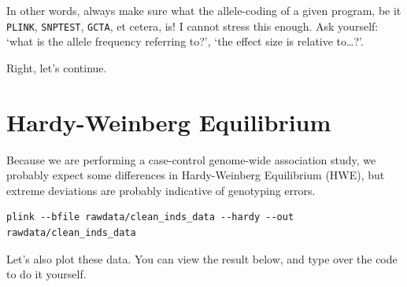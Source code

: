 \documentclass[
]{book}
\newenvironment{Shaded}{\begin{snugshade}}{\end{snugshade}}
\newcommand{\FunctionTok}[1]{\textcolor[rgb]{0.00,0.00,0.00}{#1}}
\newcommand{\NormalTok}[1]{#1}
\newcommand{\OtherTok}[1]{\textcolor[rgb]{0.56,0.35,0.01}{#1}}
\newcommand{\SpecialCharTok}[1]{\textcolor[rgb]{0.00,0.00,0.00}{#1}}
\newcommand{\StringTok}[1]{\textcolor[rgb]{0.31,0.60,0.02}{#1}}
\begin{document}
In other words, always make sure what the allele-coding of a given program, be it \texttt{PLINK}, \texttt{SNPTEST}, \texttt{GCTA}, et cetera, is! I cannot stress this enough. Ask yourself: `what is the allele frequency referring to?', `the effect size is relative to\ldots?'.

Right, let's continue.

\hypertarget{hardy-weinberg-equilibrium}{%
\section{Hardy-Weinberg Equilibrium}\label{hardy-weinberg-equilibrium}}

Because we are performing a case-control genome-wide association study, we probably expect some differences in Hardy-Weinberg Equilibrium (HWE), but extreme deviations are probably indicative of genotyping errors.

\begin{verbatim}
plink --bfile rawdata/clean_inds_data --hardy --out rawdata/clean_inds_data
\end{verbatim}

Let's also plot these data. You can view the result below, and type over the code to do it yourself.

\begin{Shaded}
\end{Shaded}
\end{document}
